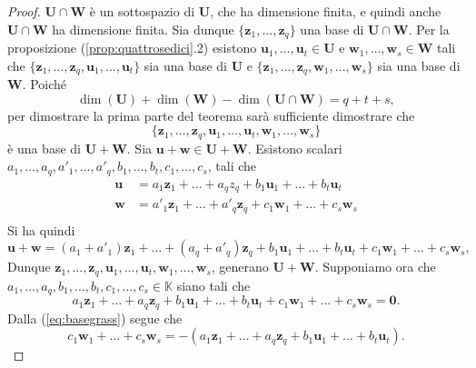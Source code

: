 \documentclass{article}
\theoremstyle{plain}
\theoremstyle{definition}
\theoremstyle{remark}
\begin{document}
\begin{proof}
    \(\mathbf{U} \cap \mathbf{W}\) è un sottospazio di \(\mathbf{U}\), che ha dimensione finita, e quindi anche 
    \(\mathbf{U} \cap \mathbf{W}\) ha dimensione finita. 
    Sia dunque \(\{\mathbf{z}_1, \ldots, \mathbf{z}_q\}\) una base di \(\mathbf{U} \cap \mathbf{W}\). 
    Per la proposizione (\ref{prop:quattrosedici}.2) esistono \(\mathbf{u}_1, \ldots, \mathbf{u}_t \in \mathbf{U}\) e \(\mathbf{w}_1, \ldots, \mathbf{w}_s \in \mathbf{W}\) tali 
    che \(\{\mathbf{z}_1, \ldots, \mathbf{z}_q, \mathbf{u}_1, \ldots, \mathbf{u}_t\}\) sia una base di \(\mathbf{U}\) e \(\{\mathbf{z}_1, \ldots, \mathbf{z}_q, \mathbf{w}_1, \ldots, \mathbf{w}_s\}\) sia una base di \(\mathbf{W}\). 
    Poiché
    \[
        \dim(\mathbf{U}) + \dim(\mathbf{W}) - \dim(\mathbf{U} \cap \mathbf{W}) = q + t + s,
    \]
    per dimostrare la prima parte del teorema sarà sufficiente dimostrare che \[\{\mathbf{z}_1, \ldots, \mathbf{z}_q, \mathbf{u}_1, \ldots, \mathbf{u}_t, \mathbf{w}_1, \ldots, \mathbf{w}_s\}\] è una base di \(\mathbf{U} + \mathbf{W}\).
    Sia \(\mathbf{u} + \mathbf{w} \in \mathbf{U} + \mathbf{W}\). 
    Esistono scalari \(a_1, \ldots, a_q, a'_1, \ldots, a'_q, b_1, \ldots, b_t, c_1, \ldots, c_s\), tali che
    \begin{align*}
        \mathbf{u} &= a_1\mathbf{z}_1 + \ldots + a_q{z}_q + b_1\mathbf{u}_1 + \ldots + b_t\mathbf{u}_t\\
        \mathbf{w} &= a'_1\mathbf{z}_1 + \ldots + a'_q\mathbf{z}_q + c_1\mathbf{w}_1 + \ldots + c_s\mathbf{w}_s\\
    \end{align*}
    Si ha quindi
    \[
        \mathbf{u} + \mathbf{w} = (a_1 + a'_1)\mathbf{z}_1 + \ldots + (a_q + a'_q)\mathbf{z}_q + b_1\mathbf{u}_1 + \ldots + b_t\mathbf{u}_t + c_1\mathbf{w}_1 + \ldots + c_s\mathbf{w}_s,
    \]
    Dunque \(\mathbf{z}_1, \ldots, \mathbf{z}_q, \mathbf{u}_1, \ldots, \mathbf{u}_t, \mathbf{w}_1, \ldots, \mathbf{w}_s\), generano \(\mathbf{U} + \mathbf{W}\).
    Supponiamo ora che \(a_1, \ldots, a_q, b_1, \ldots, b_t, c_1, \ldots, c_s \in \mathbb{K}\) siano tali che
    \begin{equation}
        a_1\mathbf{z}_1 + \ldots + a_q\mathbf{z}_q + b_1\mathbf{u}_1 + \ldots + b_t\mathbf{u}_t + c_1\mathbf{w}_1 + \ldots + c_s\mathbf{w}_s = \mathbf{0}. \label{eq:basegrass}
    \end{equation}
    Dalla (\ref{eq:basegrass}) segue che
    \begin{equation}
        c_1\mathbf{w}_1 + \ldots + c_s\mathbf{w}_s = -(a_1\mathbf{z}_1 + \ldots + a_q\mathbf{z}_q + b_1\mathbf{u}_1 + \ldots + b_t\mathbf{u}_t).  \label{eq:quattrodieci}

\end{equation}
\end{proof}
\end{document}
